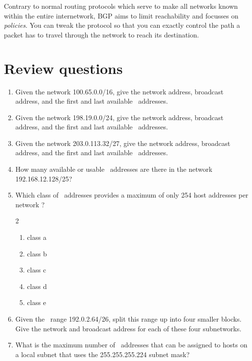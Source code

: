 Contrary to normal routing protocols which serve to make all networks known within the entire internetwork, \acs{BGP} aims to limit reachability and focusses on \emph{policies}.
You can tweak the protocol so that you can exactly control the path a packet has to travel through the network to reach its destination.



\section{Review questions}
\label{sec:ip-review-questions}

\begin{enumerate}
\item
   Given the network 100.65.0.0/16, give the network address, broadcast address, and the first and last available \IP\ addresses.
\item
   Given the network 198.19.0.0/24, give the network address, broadcast address, and the first and last available \IP\ addresses.
\item
   Given the network 203.0.113.32/27, give the network address, broadcast address, and the first and last available \IP\ addresses.
\item
   How many available or usable \IP\ addresses are there in the network 192.168.12.128/25?
\item
   Which class of \IP\ addresses provides a maximum of only 254 host addresses per network ?
   \begin{multicols}{2}
   \raggedcolumns
   \begin{enumerate}
   \item class a
   \item class b
   \item class c
   \item class d
   \item class e
   \end{enumerate}
   \end{multicols}
\item
   Given the \IP\ range 192.0.2.64/26, split this range up into four smaller blocks.
   Give the network and broadcast address for each of these four subnetworks.
\item
   What is the maximum number of \IP\ addresses that can be assigned to hosts on a local subnet that uses the 255.255.255.224 subnet mask?

\end{enumerate}
